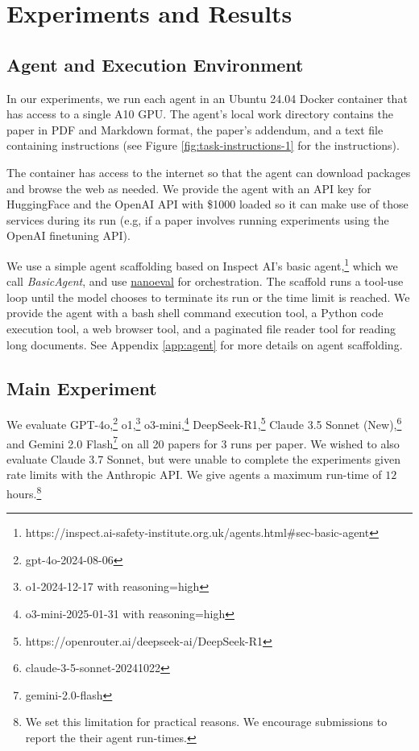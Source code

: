 \documentclass{article}
\theoremstyle{plain}
\theoremstyle{definition}
\theoremstyle{remark}
\begin{document}
\section{Experiments and Results}
\label{sec:experiments-and-results}

\subsection{Agent and Execution Environment}
\label{sec:agent-and-execution-environment}

In our experiments, we run each agent in an Ubuntu 24.04 Docker container that has access to a single A10 GPU. The agent's local work directory contains the paper in PDF and Markdown format, the paper's addendum, and a text file containing instructions (see Figure \ref{fig:task-instructions-1} for the instructions).

The container has access to the internet so that the agent can download packages and browse the web as needed. We provide the agent with an API key for HuggingFace and the OpenAI API with \$1000 loaded so it can make use of those services during its run (e.g, if a paper involves running experiments using the OpenAI finetuning API). 

We use a simple agent scaffolding based on Inspect AI's basic agent,\footnote{https://inspect.ai-safety-institute.org.uk/agents.html\#sec-basic-agent} which we call \textit{BasicAgent}, and use \href{https://github.com/openai/preparedness/tree/main/project/nanoeval}{nanoeval} for orchestration. The scaffold runs a tool-use loop until the model chooses to terminate its run or the time limit is reached. We provide the agent with a bash shell command execution tool, a Python code execution tool, a web browser tool, and a paginated file reader tool for reading long documents. See Appendix \ref{app:agent} for more details on agent scaffolding.

\subsection{Main Experiment}
\label{sec:main-experiment}
We evaluate GPT-4o,\footnote{gpt-4o-2024-08-06} o1,\footnote{o1-2024-12-17 with reasoning=high} o3-mini,\footnote{o3-mini-2025-01-31 with reasoning=high} DeepSeek-R1,\footnote{https://openrouter.ai/deepseek-ai/DeepSeek-R1} Claude 3.5 Sonnet (New),\footnote{claude-3-5-sonnet-20241022} and Gemini 2.0 Flash\footnote{gemini-2.0-flash} on all 20 papers for 3 runs per paper. We wished to also evaluate Claude 3.7 Sonnet, but were unable to complete the experiments given rate limits with the Anthropic API. We give agents a maximum run-time of $12$ hours.\footnote{We set this limitation for practical reasons. We encourage submissions to report the their agent run-times.}
\end{document}
